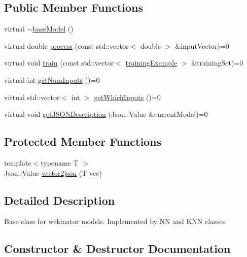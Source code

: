 \subsection*{Public Member Functions}
\begin{DoxyCompactItemize}
\item 
virtual \hyperlink{classbase_model_a7c96328a8eda015d7f1b3d195e2fd567}{$\sim$base\+Model} ()
\item 
virtual double \hyperlink{classbase_model_a95ef1dffc2857cdd1a57c23f5f9ee2d1}{process} (const std\+::vector$<$ double $>$ \&input\+Vector)=0
\item 
virtual void \hyperlink{classbase_model_ab6cbd549d6742029ab9768bc88467b4f}{train} (const std\+::vector$<$ \hyperlink{structtraining_example}{training\+Example} $>$ \&training\+Set)=0
\item 
virtual int \hyperlink{classbase_model_a1601088280ebe5be525fd1fe49d4b1e1}{get\+Num\+Inputs} ()=0
\item 
virtual std\+::vector$<$ int $>$ \hyperlink{classbase_model_a5d6b7579536f5713eed0b7b4a6687a16}{get\+Which\+Inputs} ()=0
\item 
virtual void \hyperlink{classbase_model_a54c7ba2132721c2f990ea2fe2313f863}{get\+J\+S\+O\+N\+Description} (Json\+::\+Value \&current\+Model)=0
\end{DoxyCompactItemize}
\subsection*{Protected Member Functions}
\begin{DoxyCompactItemize}
\item 
{\footnotesize template$<$typename T $>$ }\\Json\+::\+Value \hyperlink{classbase_model_a853d3a2d610c43fca37676ac1459e3b9}{vector2json} (T vec)
\end{DoxyCompactItemize}


\subsection{Detailed Description}
Base class for wekinator models. Implemented by NN and K\+NN classes 

\subsection{Constructor \& Destructor Documentation}
\mbox{\label{classbase_model_a7c96328a8eda015d7f1b3d195e2fd567}} 

